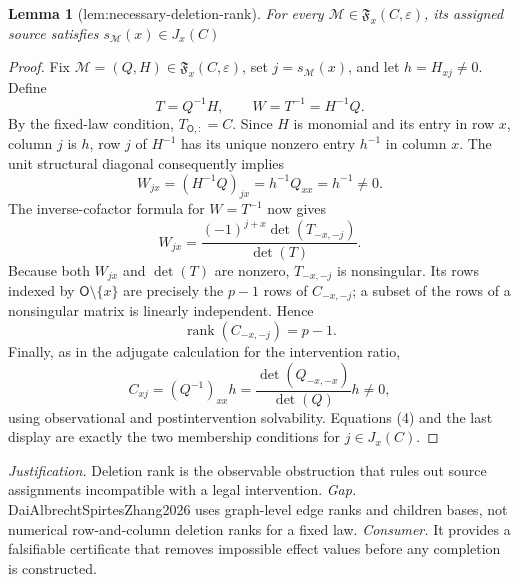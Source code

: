 \documentclass{article}
\newtheorem{lemma}{Lemma}
\begin{document}
\begin{lemma}[lem:necessary-deletion-rank]\label{lem:necessary-deletion-rank}
For every \(\mathcal M\in\mathfrak F_x(C,\varepsilon)\), its assigned source satisfies \(s_{\mathcal M}(x)\in J_x(C)\)
\end{lemma}
\begin{proof}
Fix \(\mathcal M=(Q,H)\in\mathfrak F_x(C,\varepsilon)\), set \(j=s_{\mathcal M}(x)\), and let \(h=H_{xj}\ne0\). Define
\[
 T=Q^{-1}H,\qquad W=T^{-1}=H^{-1}Q.
\]
By the fixed-law condition, \(T_{\mathsf O,:}=C\). Since \(H\) is monomial and its entry in row \(x\), column \(j\) is \(h\), row \(j\) of \(H^{-1}\) has its unique nonzero entry \(h^{-1}\) in column \(x\). The unit structural diagonal consequently implies
\[
 W_{jx}=(H^{-1}Q)_{jx}=h^{-1}Q_{xx}=h^{-1}\ne0. \tag{3}
\]
The inverse-cofactor formula for \(W=T^{-1}\) now gives
\[
 W_{jx}=\frac{(-1)^{j+x}\det(T_{-x,-j})}{\det(T)}.
\]
Because both \(W_{jx}\) and \(\det(T)\) are nonzero, \(T_{-x,-j}\) is nonsingular. Its rows indexed by \(\mathsf O\setminus\{x\}\) are precisely the \(p-1\) rows of \(C_{-x,-j}\); a subset of the rows of a nonsingular matrix is linearly independent. Hence
\[
 \operatorname{rank}(C_{-x,-j})=p-1. \tag{4}
\]
Finally, as in the adjugate calculation for the intervention ratio,
\[
 C_{xj}=(Q^{-1})_{xx}h
 =\frac{\det(Q_{-x,-x})}{\det(Q)}h\ne0,
\]
using observational and postintervention solvability. Equations (4) and the last display are exactly the two membership conditions for \(j\in J_x(C)\).
\end{proof}
\par\smallskip\noindent \textit{Justification.} Deletion rank is the observable obstruction that rules out source assignments incompatible with a legal intervention. \textit{Gap.} DaiAlbrechtSpirtesZhang2026 uses graph-level edge ranks and children bases, not numerical row-and-column deletion ranks for a fixed law. \textit{Consumer.} It provides a falsifiable certificate that removes impossible effect values before any completion is constructed.
\end{document}
